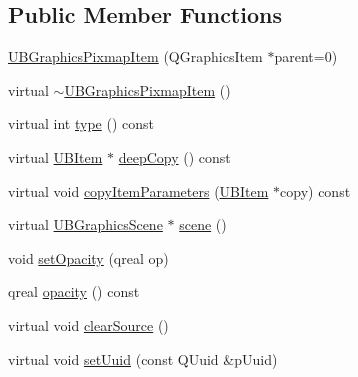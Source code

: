 \subsection*{Public Member Functions}
\begin{DoxyCompactItemize}
\item 
\hyperlink{class_u_b_graphics_pixmap_item_ad154326709d1935d96248228d21b20ae}{U\-B\-Graphics\-Pixmap\-Item} (Q\-Graphics\-Item $\ast$parent=0)
\item 
virtual \hyperlink{class_u_b_graphics_pixmap_item_a4f926ebe9491c29ff899d4467f69b087}{$\sim$\-U\-B\-Graphics\-Pixmap\-Item} ()
\item 
virtual int \hyperlink{class_u_b_graphics_pixmap_item_a0d3077ae69919c91d867f34e22f47c88}{type} () const 
\item 
virtual \hyperlink{class_u_b_item}{U\-B\-Item} $\ast$ \hyperlink{class_u_b_graphics_pixmap_item_a1b0fbc4ae6ba2796e5cccb0ea16b8c70}{deep\-Copy} () const 
\item 
virtual void \hyperlink{class_u_b_graphics_pixmap_item_a800d04419404cec2d43f4feccb1673e6}{copy\-Item\-Parameters} (\hyperlink{class_u_b_item}{U\-B\-Item} $\ast$copy) const 
\item 
virtual \hyperlink{class_u_b_graphics_scene}{U\-B\-Graphics\-Scene} $\ast$ \hyperlink{class_u_b_graphics_pixmap_item_a972dad2ba6b44804cfff411fb54c15ee}{scene} ()
\item 
void \hyperlink{class_u_b_graphics_pixmap_item_a93680a1e04ba6a40840217d9e380761f}{set\-Opacity} (qreal op)
\item 
qreal \hyperlink{class_u_b_graphics_pixmap_item_a6cc4d90efc679f54b89295f4cf3f94aa}{opacity} () const 
\item 
virtual void \hyperlink{class_u_b_graphics_pixmap_item_abbc63eb91023c55073299fb74b822f9b}{clear\-Source} ()
\item 
virtual void \hyperlink{class_u_b_graphics_pixmap_item_a822a466ea3b7a87e5c109e1af96c3d14}{set\-Uuid} (const Q\-Uuid \&p\-Uuid)
\end{DoxyCompactItemize}
